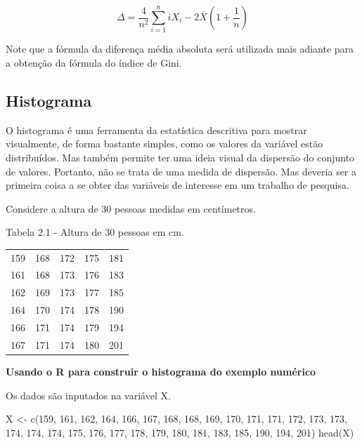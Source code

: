 \documentclass[
]{book}
\newenvironment{Shaded}{\begin{snugshade}}{\end{snugshade}}
\newcommand{\DecValTok}[1]{\textcolor[rgb]{0.00,0.00,0.81}{#1}}
\newcommand{\FunctionTok}[1]{\textcolor[rgb]{0.00,0.00,0.00}{#1}}
\newcommand{\NormalTok}[1]{#1}
\newcommand{\OtherTok}[1]{\textcolor[rgb]{0.56,0.35,0.01}{#1}}
\begin{document}
\[
  \Delta = \dfrac{4}{n^2} \sum_{i=1}^{n} iX_i - 2\overline{X}\left( 1 + \dfrac{1}{n} \right)
  \label{eq:DiferencaAbsolutaMediaFinal}
\]

Note que a fórmula da diferença média absoluta será utilizada mais adiante para a obtenção da fórmula do índice de Gini.

\hypertarget{histograma}{%
\subsection{Histograma}\label{histograma}}

O histograma é uma ferramenta da estatística descritiva para mostrar visualmente, de forma bastante simples, como os valores da variável estão distribuídos. Mas também permite ter uma ideia visual da dispersão do conjunto de valores. Portanto, não se trata de uma medida de dispersão. Mas deveria ser a primeira coisa a se obter das variáveis de interesse em um trabalho de pesquisa.

Considere a altura de 30 pessoas medidas em centímetros.

Tabela 2.1 - Altura de 30 pessoas em cm.

\begin{longtable}[]{@{}ccccc@{}}
\toprule
& & & & \\
\midrule
\endhead
159 & 168 & 172 & 175 & 181 \\
161 & 168 & 173 & 176 & 183 \\
162 & 169 & 173 & 177 & 185 \\
164 & 170 & 174 & 178 & 190 \\
166 & 171 & 174 & 179 & 194 \\
167 & 171 & 174 & 180 & 201 \\
\bottomrule
\end{longtable}

\textbf{Usando o R para construir o histograma do exemplo numérico}

Os dados são inputados na variável X.

\begin{Shaded}
\begin{Highlighting}[]
\NormalTok{X }\OtherTok{\textless{}{-}} \FunctionTok{c}\NormalTok{(}\DecValTok{159}\NormalTok{, }\DecValTok{161}\NormalTok{, }\DecValTok{162}\NormalTok{, }\DecValTok{164}\NormalTok{, }\DecValTok{166}\NormalTok{, }\DecValTok{167}\NormalTok{, }\DecValTok{168}\NormalTok{, }\DecValTok{168}\NormalTok{, }\DecValTok{169}\NormalTok{, }
    \DecValTok{170}\NormalTok{, }\DecValTok{171}\NormalTok{, }\DecValTok{171}\NormalTok{, }\DecValTok{172}\NormalTok{, }\DecValTok{173}\NormalTok{, }\DecValTok{173}\NormalTok{, }\DecValTok{174}\NormalTok{, }\DecValTok{174}\NormalTok{, }\DecValTok{174}\NormalTok{, }\DecValTok{175}\NormalTok{, }
    \DecValTok{176}\NormalTok{, }\DecValTok{177}\NormalTok{, }\DecValTok{178}\NormalTok{, }\DecValTok{179}\NormalTok{, }\DecValTok{180}\NormalTok{, }\DecValTok{181}\NormalTok{, }\DecValTok{183}\NormalTok{, }\DecValTok{185}\NormalTok{, }\DecValTok{190}\NormalTok{, }\DecValTok{194}\NormalTok{, }
    \DecValTok{201}\NormalTok{)}
\FunctionTok{head}\NormalTok{(X)}
\end{Highlighting}
\end{Shaded}
\end{document}
